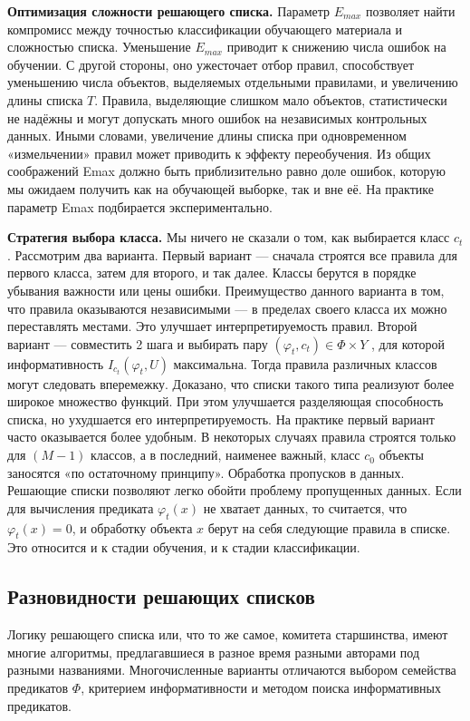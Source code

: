 \textbf{Оптимизация сложности решающего списка.} Параметр $E_{max}$ позволяет найти
компромисс между точностью классификации обучающего материала и сложностью
списка. Уменьшение $E_{max}$ приводит к снижению числа ошибок на обучении. С другой
стороны, оно ужесточает отбор правил, способствует уменьшению числа объектов,
выделяемых отдельными правилами, и увеличению длины списка $T$. Правила, выделяющие слишком мало объектов, статистически не надёжны и могут допускать много
ошибок на независимых контрольных данных. Иными словами, увеличение длины
списка при одновременном «измельчении» правил может приводить к эффекту переобучения. Из общих соображений Emax должно быть приблизительно равно доле
ошибок, которую мы ожидаем получить как на обучающей выборке, так и вне её.
На практике параметр Emax подбирается экспериментально.

\textbf{Стратегия выбора класса.} Мы ничего не сказали о том, как выбирается класс $c_t$. Рассмотрим два варианта.
Первый вариант — сначала строятся все правила для первого класса, затем для второго, и так далее. Классы берутся в порядке убывания важности или цены ошибки. Преимущество данного варианта в том, что правила оказываются независимыми — в пределах своего класса их можно переставлять местами. Это улучшает
интерпретируемость правил.
Второй вариант — совместить 2 шага и выбирать пару $(\varphi_t
    , c_t) \in \Phi \times Y$ , для
которой информативность $I_{c_t}(\varphi_t, U)$ максимальна. Тогда правила различных классов
могут следовать вперемежку. Доказано, что списки такого типа реализуют более широкое множество функций. При этом улучшается разделяющая способность
списка, но ухудшается его интерпретируемость.
На практике первый вариант часто оказывается более удобным. В некоторых случаях правила строятся только для $(M - 1)$ классов, а в последний, наименее
важный, класс $c_0$ объекты заносятся «по остаточному принципу».
Обработка пропусков в данных. Решающие списки позволяют легко обойти проблему пропущенных данных. Если для вычисления предиката 
$\varphi_t(x)$ не хватает данных, то считается, что $\varphi_t(x) = 0$, и обработку объекта $x$ берут на себя следующие
правила в списке. Это относится и к стадии обучения, и к стадии классификации.

\subsection{Разновидности решающих списков}
Логику решающего списка или, что то же самое, комитета старшинства, имеют
многие алгоритмы, предлагавшиеся в разное время разными авторами под разными названиями. Многочисленные варианты отличаются выбором семейства предикатов $\Phi$, критерием информативности и методом поиска информативных предикатов.

